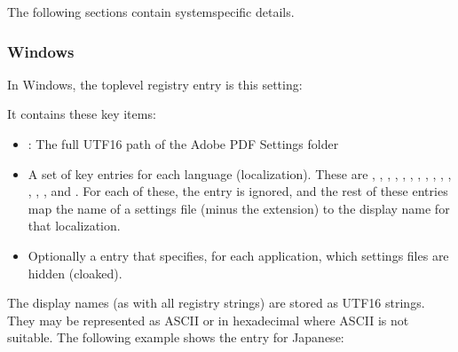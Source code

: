 \documentclass[letterpaper,12pt,english,openany,oneside]{sphinxmanual}
\begin{document}
The following sections contain system\sphinxhyphen{}specific details.


\subsubsection{Windows}
\label{\detokenize{index:windows}}
In Windows, the top\sphinxhyphen{}level registry entry is this setting:

\begin{sphinxVerbatim}[commandchars=\\\{\}]
  
\end{sphinxVerbatim}

It contains these key items:
\begin{itemize}
\item {} 
 : The full UTF\sphinxhyphen{}16 path of the Adobe PDF Settings folder

\item {} 
A set of key entries for each language (localization). These are  ,  ,  ,  ,  ,  ,  ,  ,  ,  ,  ,  ,  ,  , and  . For each of these, the  entry is ignored, and the rest of these entries map the name of a settings file (minus the  extension) to the display name for that localization.

\item {} 
Optionally a  entry that specifies, for each application, which settings files are hidden (cloaked).

\end{itemize}

The display names (as with all registry strings) are stored as UTF\sphinxhyphen{}16 strings. They may be represented as ASCII or in hexadecimal where ASCII is not suitable. The following example shows the entry for Japanese:
\end{document}
